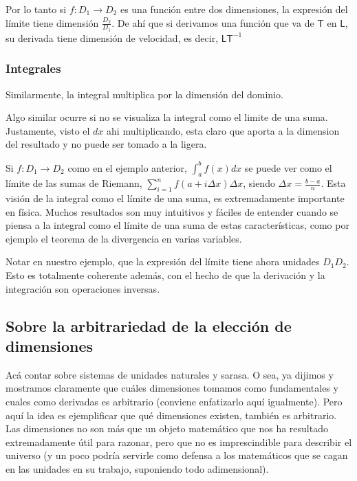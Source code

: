 \documentclass{article}
\def\longitud{\mathsf L}
\def\tiempo{\mathsf T}
\begin{document}
Por lo tanto si $f : D_1 \rightarrow D_2$ es una función entre dos dimensiones, la expresión del límite tiene dimensión $\frac{D_2}{D_1}$.
De ahí que si derivamos una función que va de $\tiempo$ en $\longitud$, su derivada tiene dimensión de velocidad, es decir, $\longitud \tiempo^{-1}$

\subsubsection{Integrales}

Similarmente, la integral multiplica por la dimensión del dominio. 

Algo similar ocurre si no se visualiza la integral como el limite de una suma. Justamente, visto el $dx$ ahi multiplicando,
esta claro que aporta a la dimension del resultado y no puede ser tomado a la ligera.

Si $f : D_1 \rightarrow D_2$ como en el ejemplo anterior, $\int_{a}^{b}{f(x) dx}$ se puede ver como el límite de las sumas
de Riemann, $\sum_{i=1}^{n}{f(a + i \Delta x) \Delta x}$, siendo $\Delta x = \frac{b-a}{n}$. Esta visión de la integral como
el límite de una suma, es extremadamente importante en física. Muchos resultados son muy intuitivos y fáciles de entender
cuando se piensa a la integral como el límite de una suma de estas características, como por ejemplo el teorema de la divergencia
en varias variables.

Notar en nuestro ejemplo, que la expresión del límite tiene ahora unidades $D_1 D_2$. Esto es totalmente coherente además, con el
hecho de que la derivación y la integración son operaciones inversas.

\subsection{Sobre la arbitrariedad de la elección de dimensiones}

Acá contar sobre sistemas de unidades naturales y sarasa. O sea, ya dijimos y mostramos claramente que cuáles
dimensiones tomamos como fundamentales y cuales como derivadas es arbitrario (conviene enfatizarlo aquí igualmente).
Pero aquí la idea es ejemplificar que qué dimensiones existen, también es arbitrario. Las dimensiones no son más
que un objeto matemático que nos ha resultado extremadamente útil para razonar, pero que no es imprescindible para describir el
universo (y un poco podría servirle como defensa a los matemáticos que se cagan en las unidades en su trabajo, suponiendo
todo adimensional).
\end{document}
